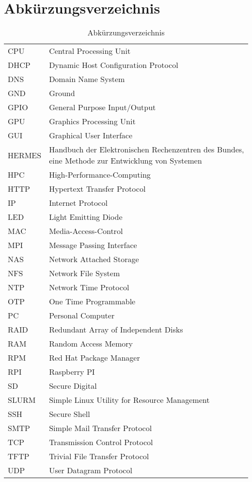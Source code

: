 \section{Abkürzungsverzeichnis}

\begin{table}[H]
\centering
\label{my-label}
\begin{tabular}{p{2cm}p{14cm}}
CPU & Central Processing Unit \\
DHCP & Dynamic Host Configuration Protocol \\
DNS & Domain Name System \\
GND & Ground \\
GPIO & General Purpose Input/Output \\
GPU & Graphics Processing Unit \\
GUI & Graphical User Interface \\
HERMES & Handbuch der Elektronischen Rechenzentren des Bundes, eine Methode zur Entwicklung von Systemen \\
HPC & High-Performance-Computing \\
HTTP & Hypertext Transfer Protocol \\
IP & Internet Protocol \\
LED & Light Emitting Diode \\
MAC & Media-Access-Control \\
MPI & Message Passing Interface \\
NAS & Network Attached Storage  \\
NFS & Network File System \\
NTP & Network Time Protocol \\
OTP & One Time Programmable \\
PC & Personal Computer \\
RAID & Redundant Array of Independent Disks \\
RAM & Random Access Memory \\
RPM & Red Hat Package Manager \\
RPI & Raspberry PI \\
SD & Secure Digital \\
SLURM & Simple Linux Utility for Resource Management \\
SSH & Secure Shell  \\
SMTP & Simple Mail Transfer Protocol \\
TCP & Transmission Control Protocol \\
TFTP & Trivial File Transfer Protocol \\
UDP & User Datagram Protocol \\
\end{tabular}
\caption{Abkürzungsverzeichnis}
\end{table}
